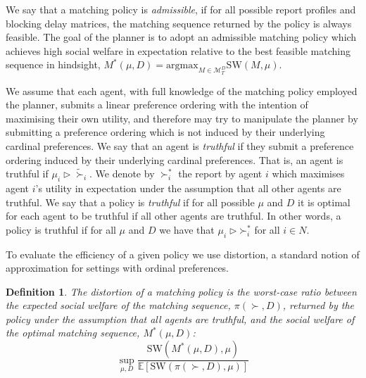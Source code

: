 \documentclass[letterpaper,11pt]{article}
\newtheorem{defn}{Definition}
\newcommand{\argmax}{\text{argmax}}
\begin{document}
    We say that a matching policy is \emph{admissible}, if for all possible report profiles and blocking delay matrices, the matching sequence returned by the policy is always feasible. The goal of the planner is to adopt an admissible matching policy which achieves high social welfare in expectation relative to the best feasible matching sequence in hindsight, $M^{*}(\mu, D) = \argmax_{M \in \mathcal{M}_{T}^{D}} \textrm{SW}(M, \mu)$.
    
    We assume that each agent, with full knowledge of the matching policy employed the planner, submits a linear preference ordering with the intention of maximising their own utility, and therefore may try to manipulate the planner by submitting a preference ordering which is not induced by their underlying cardinal preferences. We say that an agent is \emph{truthful} if they submit a preference ordering induced by their underlying cardinal preferences. That is, an agent is truthful if $\mu_{i} \rhd \tilde{\succ}_{i}$.  We denote by $\succ_{i}^{*}$ the report by agent $i$ which maximises agent $i$'s utility in expectation under the assumption that all other agents are truthful. We say that a policy is \emph{truthful} if for all possible $\mu$ and $D$ it is optimal for each agent to be truthful if all other agents are truthful. %
    In other words, a policy is truthful if for all $\mu$ and $D$ we have that $\mu_{i} \rhd \mathord{\succ}^{*}_{i}$ for all $i \in N$.
    
    To evaluate the efficiency of a given policy we use distortion, a standard notion of approximation for settings with ordinal preferences. 
    
    \begin{defn}
        The distortion of a matching policy is the worst-case ratio between the expected social welfare of the matching sequence, $\pi(\succ, D)$, returned by the policy under the assumption that all agents are truthful, and the social welfare of the optimal matching sequence, $M^{*}(\mu, D)$:
        \begin{equation*}
            \sup_{\mu, D}\frac{\textrm{SW}(M^{*}(\mu, D), \mu)}{\mathbb{E}\left[\textrm{SW}(\pi(\succ, D), \mu)\right]}
        \end{equation*}
    \end{defn}
\end{document}
